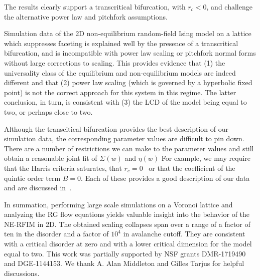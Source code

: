 \documentclass[reprint,amsmath,amssymb,aps,floatfix]{revtex4-1}
\begin{document}
%
\noindent The results clearly support a transcritical bifurcation, with $r_c<0$, and challenge the alternative power law and pitchfork assumptions.\par
%
Simulation data of the 2D non-equilibrium random-field Ising model on a lattice which suppresses faceting is explained well by the presence of a transcritical bifurcation, and is incompatible with power law scaling or pitchfork normal forms without large corrections to scaling. This provides evidence that (1) the universality class of the equilibrium and non-equilibrium models are indeed different and that (2) power law scaling (which is governed by a hyperbolic fixed point) is not the correct approach for this system in this regime. The latter conclusion, in turn, is consistent with (3) the LCD of the model being equal to two, or perhaps close to two.   \par
%
Although the transcitical bifurcation provides the best description of our simulation data, the corresponding parameter values are difficult to pin down. There are a number of restrictions we can make to the parameter values and still obtain a reasonable joint fit of $\Sigma(w)$ and $\eta(w)$ For example, we may require that the Harris criteria saturates, that $r_c=0$~\cite{Perkovic96} or that the coefficient of the quintic order term $B=0$. Each of these provides a good description of our data and are discussed in~\cite[Section~\ref{supp-app:goodfits}]{RFIM2Dsupp}. \par
%
In summation, performing large scale simulations on a Voronoi lattice and analyzing the RG flow equations yields valuable insight into the behavior of the NE-RFIM in 2D. The obtained scaling collapses span over a range of a factor of ten in the disorder and a factor of $10^4$ in avalanche cutoff. They are consistent with a critical disorder at zero and with a lower critical dimension for the model equal to two. 
%
This work was partially supported by NSF grants  DMR-1719490 and DGE-1144153. We thank A. Alan Middleton and Gilles Tarjus for helpful discussions. 

{}
\end{document}
